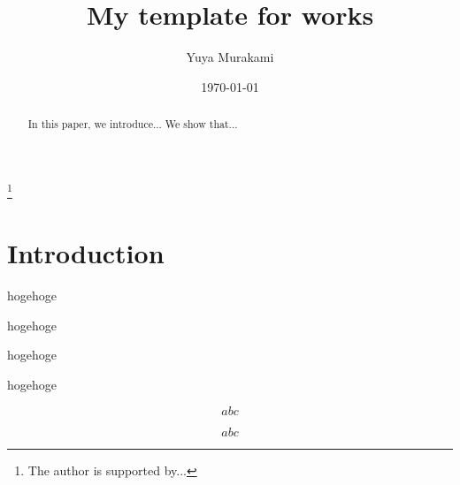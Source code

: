 \documentclass[11pt,a4paper,reqno,lualatex]{amsart} %
\numberwithin{equation}{section} %
\begin{document}


\title[Short title]{My template for works}
\author[Y. Murakami]{Yuya Murakami}
\address{Faculty of Mathematics, Kyushu University, 744, Motooka, Nishi-ku, Fukuoka, 819-0395, JAPAN}
\thanks{The author is supported by...}

\date{\today}

\maketitle


\begin{abstract}
	In this paper, we introduce...
	We show that...
\end{abstract}


\tableofcontents


\section{Introduction} \label{sec:intro}


\begin{thm} \label{thm:main}
	hogehoge
\end{thm}

\begin{thm} \label{thm:main2}
	hogehoge
\end{thm}

\begin{thm} \label{thm:main3}
	hogehoge
\end{thm}

\begin{lem} \label{lem:1}
	hogehoge
\end{lem}

\begin{equation} \label{eq:1}
	abc
\end{equation}

\begin{equation} \label{eq:2}
	abc
\end{equation}
\end{document}
